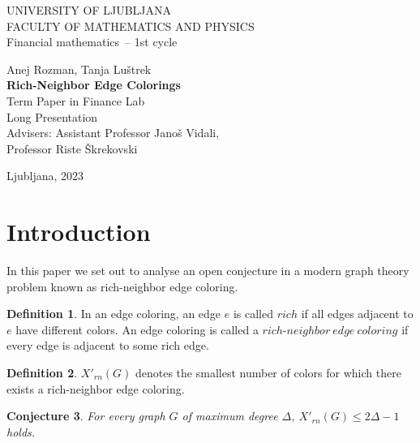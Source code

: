\documentclass[12pt,a4paper]{amsart}
\theoremstyle{definition} %
\newtheorem{definicija}{Definition}[section]
\theoremstyle{plain} %
\newtheorem{conjecture}[definicija]{Conjecture}
\newcommand{\program}{Financial mathematics} %
\newcommand{\imeavtorja}{Anej Rozman, Tanja Luštrek} %
\newcommand{\imementorja}{Assistant Professor Janoš Vidali} %
\newcommand{\imesomentorja}{Professor Riste Škrekovski}
\newcommand{\naslovdela}{Rich-Neighbor Edge Colorings}
\newcommand{\letnica}{2023} %
\begin{document}
\thispagestyle{empty}
{\large
\noindent UNIVERSITY OF LJUBLJANA\\[1mm]
FACULTY OF MATHEMATICS AND PHYSICS\\[5mm]
\program\ -- 1st cycle}
\vfill

\begin{center}{\large
\imeavtorja\\[2mm]
{\bf \naslovdela}\\[10mm]
Term Paper in Finance Lab\\[2mm]
Long Presentation\\[1cm]
Advisers: \imementorja, \\ \imesomentorja\\[2mm]}
\end{center}
\vfill

{\large
Ljubljana, \letnica}
\pagebreak

\section{Introduction}

In this paper we set out to analyse an open conjecture in a modern graph theory problem known as rich-neighbor edge coloring.

\begin{definicija}
    In an edge coloring, an edge $e$ is called $rich$ if all edges adjacent to $e$ have different colors. An edge coloring is 
    called a $rich\text{-}neighbor \ edge \ coloring$ if every edge is adjacent to some rich edge.
\end{definicija}

\begin{definicija}
    $X'_{rn}(G)$ denotes the smallest number of colors for which there exists a rich-neighbor edge coloring.
\end{definicija}

\begin{conjecture}
    For every graph $G$ of maximum degree $\Delta$, $X'_{rn}(G) \leq 2\Delta - 1$ holds.
\end{conjecture}
\end{document}

